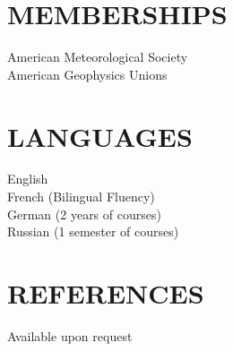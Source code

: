 \documentclass[margin]{res}
\begin{document}
\begin{resume}
\section{MEMBERSHIPS}            
                {American Meteorological Society} \\
                {American Geophysics Unions}

\section{LANGUAGES}
                English \\
                French (Bilingual Fluency) \\
                German (2 years of courses) \\
                Russian (1 semester of courses)

\section{REFERENCES} 
                Available upon request

\end{resume}
\end{document}

